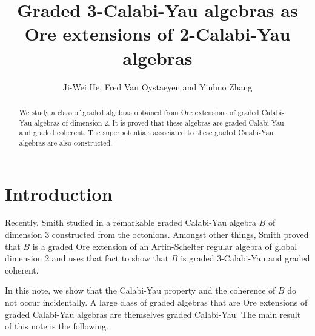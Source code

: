 \documentclass[a4paper]{amsart}
\begin{document}
\title[Ore extensions of graded 2-CY algebras]{\bf Graded 3-Calabi-Yau algebras as Ore extensions of 2-Calabi-Yau algebras}

\author{Ji-Wei He, Fred Van Oystaeyen and Yinhuo Zhang}
\address{J.-W. He\newline \indent Department of Mathematics, Shaoxing College of Arts and Sciences, Shaoxing Zhejiang 312000,
China\newline \indent Department of Mathematics and Computer
Science, University of Antwerp, Middelheimlaan 1, B-2020 Antwerp,
Belgium} 
\address{F. Van Oystaeyen\newline\indent Department of Mathematics and Computer
Science, University of Antwerp, Middelheimlaan 1, B-2020 Antwerp,
Belgium} 
\address{Y. Zhang\newline
\indent Department WNI, University of Hasselt, Universitaire Campus,
3590 Diepenbeek, Belgium} 

\date{}
\begin{abstract} We study a class of graded algebras obtained from Ore extensions of graded Calabi-Yau algebras of dimension 2. It is proved that these algebras are graded Calabi-Yau and graded coherent. The superpotentials associated to these graded Calabi-Yau algebras are also constructed.
\end{abstract}


\maketitle
\vspace{5mm}

\section*{Introduction}

Recently, Smith studied in \cite{Sm} a remarkable graded Calabi-Yau algebra $B$ of dimension 3 constructed from the octonions. Amongst other things, Smith proved that $B$ is a graded Ore extension of an Artin-Schelter regular algebra of global dimension 2 and uses that fact to show that $B$ is graded 3-Calabi-Yau and graded coherent.

In this note, we show that the Calabi-Yau property and the coherence of $B$ do not occur incidentally. A large class of graded algebras that are Ore extensions of graded Calabi-Yau algebras are themselves graded Calabi-Yau. The main result of this note is the following.
\end{document}
